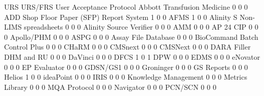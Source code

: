 \documentclass{article}
\begin{document}
\begin{Schunk}
\begin{Soutput}
                                           URS URS/FRS User Acceptance Protocol
  Abbott Transfusion Medicine                0       0                        0
  ADD Shop Floor Paper (SFP) Report System   1       0                        0
  AFMS                                       1       0                        0
  Alinity S Non-LIMS spreadsheets            0       0                        0
  Alinity Source Verifier                    0       0                        0
  AMM                                        0       0                        0
  AP 24 CIP                                  0       0                        0
  Apollo/PHM                                 0       0                        0
  ASPG                                       0       0                        0
  Assay File Database                        0       0                        0
  BioCommand Batch Control Plus              0       0                        0
  CHaRM                                      0       0                        0
  CMSnext                                    0       0                        0
  CMSNext                                    0       0                        0
  DARA Filler DHM and RU                     0       0                        0
  DaVinci                                    0       0                        0
  DFCS                                       1       0                        1
  DPW                                        0       0                        0
  EDMS                                       0       0                        0
  eNovator                                   0       0                        0
  EP Evaluator                               0       0                        0
  GDSN/GS1                                   0       0                        0
  Groninger                                  0       0                        0
  GS Reports                                 0       0                        0
  Helios                                     1       0                        0
  ideaPoint                                  0       0                        0
  IRIS                                       0       0                        0
  Knowledge Management                       0       0                        0
  Metrics Library                            0       0                        0
  MQA Protocol                               0       0                        0
  Navigator                                  0       0                        0
  PCN/SCN                                    0       0                        0

\end{Soutput}
\end{Schunk}
\end{document}
